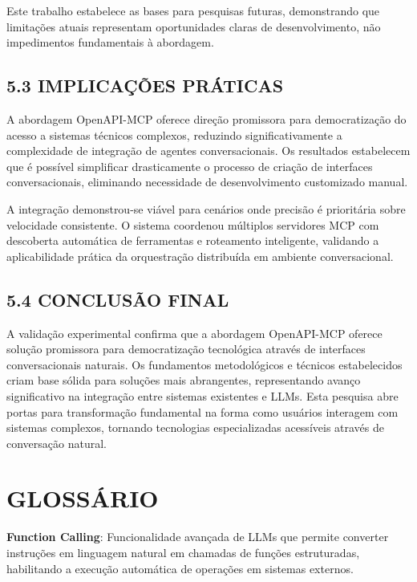 \documentclass[
]{article}
\begin{document}
Este trabalho estabelece as bases para pesquisas futuras, demonstrando
que limitações atuais representam oportunidades claras de
desenvolvimento, não impedimentos fundamentais à abordagem.

\subsection{5.3 IMPLICAÇÕES
PRÁTICAS}\label{implicauxe7uxf5es-pruxe1ticas}

A abordagem OpenAPI-MCP oferece direção promissora para democratização
do acesso a sistemas técnicos complexos, reduzindo significativamente a
complexidade de integração de agentes conversacionais. Os resultados
estabelecem que é possível simplificar drasticamente o processo de
criação de interfaces conversacionais, eliminando necessidade de
desenvolvimento customizado manual.

A integração demonstrou-se viável para cenários onde precisão é
prioritária sobre velocidade consistente. O sistema coordenou múltiplos
servidores MCP com descoberta automática de ferramentas e roteamento
inteligente, validando a aplicabilidade prática da orquestração
distribuída em ambiente conversacional.

\subsection{5.4 CONCLUSÃO FINAL}\label{conclusuxe3o-final}

A validação experimental confirma que a abordagem OpenAPI-MCP oferece
solução promissora para democratização tecnológica através de interfaces
conversacionais naturais. Os fundamentos metodológicos e técnicos
estabelecidos criam base sólida para soluções mais abrangentes,
representando avanço significativo na integração entre sistemas
existentes e LLMs. Esta pesquisa abre portas para transformação
fundamental na forma como usuários interagem com sistemas complexos,
tornando tecnologias especializadas acessíveis através de conversação
natural.

\section{GLOSSÁRIO}\label{glossuxe1rio}

\textbf{Function Calling}: Funcionalidade avançada de LLMs que permite
converter instruções em linguagem natural em chamadas de funções
estruturadas, habilitando a execução automática de operações em sistemas
externos.
\end{document}
